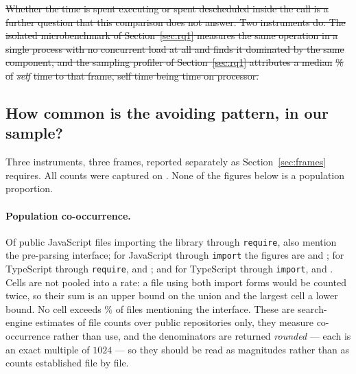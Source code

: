 \documentclass[pdflatex,sn-basic,twocolumn]{sn-jnl}%
\providecommand{\DIFdel}[1]{{\protect\color{red}\sout{#1}}}                      %
\providecommand{\DIFdelend}{} %
\DeclareRobustCommand{\DIFdelend}{\DIFOaddend \let\includegraphics\DIFOincludegraphics} %
\begin{document}
\DIFdel{Whether the time is spent executing or spent descheduled inside the call is a
further question that this comparison does not answer. Two instruments do. The
isolated microbenchmark of Section~\ref{sec:rq1} measures the same operation in a
single process with no concurrent load at all and finds it dominated by the same
component, and the sampling profiler of Section~\ref{sec:rq1} attributes a median
}%
\DIFdel{\% of }\emph{\DIFdel{self}} %
\DIFdel{time to that frame, self time being time on
processor.
}%


\DIFdelend \subsection{How common is the avoiding pattern, in our
sample?}\label{sec:prevalence}

Three instruments, three frames, reported separately as Section~\ref{sec:frames}
requires. All counts were captured on \PopCapturedAt. None of the figures below
is a population proportion.

\paragraph{Population co-occurrence.} Of \PopJsRequireFiles{} public JavaScript
files importing the library through \texttt{require},
\PopJsRequireFilesWithApi{} also mention the pre-parsing interface; for
JavaScript through \texttt{import} the figures are \PopJsImportFiles{} and
\PopJsImportFilesWithApi; for TypeScript through \texttt{require},
\PopTsRequireFiles{} and \PopTsRequireFilesWithApi; and for TypeScript through
\texttt{import}, \PopTsImportFiles{} and \PopTsImportFilesWithApi. Cells are not
pooled into a rate: a file using both import forms would be counted twice, so
their sum \PopSumFiles{} is an upper bound on the union and the largest cell
\PopLargestCellFiles{} a lower bound. No cell exceeds \PopWorstCellPct\% of files
mentioning the interface. These are search-engine estimates of file counts over
public repositories only, they measure co-occurrence rather than use, and the
denominators are returned \emph{rounded} --- each is an exact multiple of $1024$
--- so they should be read as magnitudes rather than as counts established file
by file.
\end{document}
